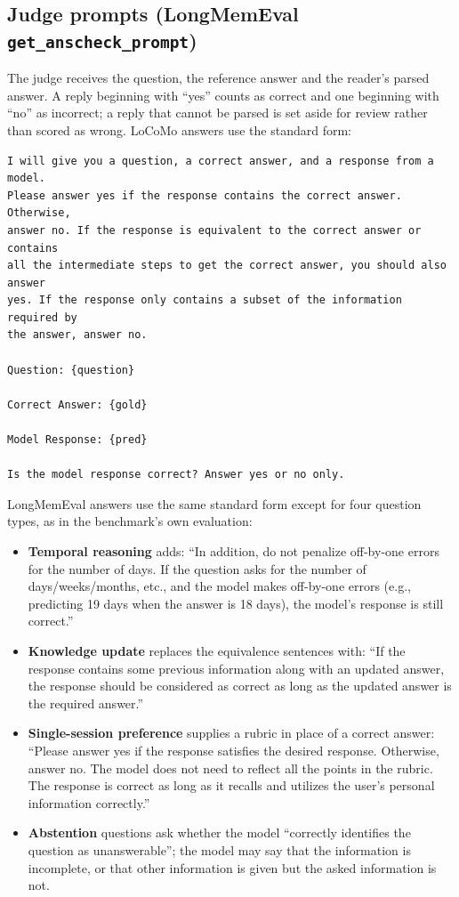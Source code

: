 \subsection*{Judge prompts (LongMemEval \texttt{get\_anscheck\_prompt})}

The judge receives the question, the reference answer and the reader's parsed answer. A reply
beginning with ``yes'' counts as correct and one beginning with ``no'' as incorrect; a reply that
cannot be parsed is set aside for review rather than scored as wrong. LoCoMo answers use the
standard form:

\begin{small}
\begin{verbatim}
I will give you a question, a correct answer, and a response from a model.
Please answer yes if the response contains the correct answer. Otherwise,
answer no. If the response is equivalent to the correct answer or contains
all the intermediate steps to get the correct answer, you should also answer
yes. If the response only contains a subset of the information required by
the answer, answer no.

Question: {question}

Correct Answer: {gold}

Model Response: {pred}

Is the model response correct? Answer yes or no only.
\end{verbatim}
\end{small}

LongMemEval answers use the same standard form except for four question types, as in the
benchmark's own evaluation:
\begin{itemize}
  \item \textbf{Temporal reasoning} adds: ``In addition, do not penalize off-by-one errors for the
        number of days. If the question asks for the number of days/weeks/months, etc., and the
        model makes off-by-one errors (e.g., predicting 19 days when the answer is 18 days), the
        model's response is still correct.''
  \item \textbf{Knowledge update} replaces the equivalence sentences with: ``If the response
        contains some previous information along with an updated answer, the response should be
        considered as correct as long as the updated answer is the required answer.''
  \item \textbf{Single-session preference} supplies a rubric in place of a correct answer: ``Please
        answer yes if the response satisfies the desired response. Otherwise, answer no. The model
        does not need to reflect all the points in the rubric. The response is correct as long as
        it recalls and utilizes the user's personal information correctly.''
  \item \textbf{Abstention} questions ask whether the model ``correctly identifies the question as
        unanswerable''; the model may say that the information is incomplete, or that other
        information is given but the asked information is not.
\end{itemize}

